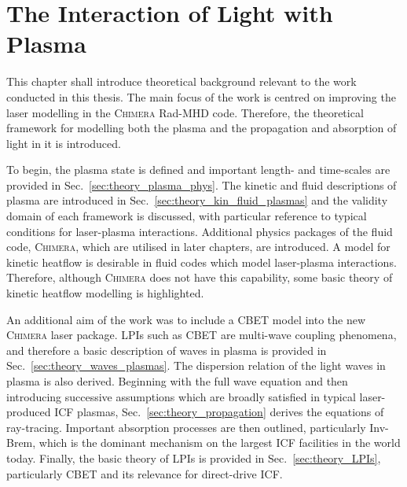 \chapter{The Interaction of Light with Plasma}%
\label{chap:Theory}

This chapter shall introduce theoretical background relevant to the work conducted in this thesis.
The main focus of the work is centred on improving the laser modelling in the \textsc{Chimera} \ac{Rad-MHD} code.
Therefore, the theoretical framework for modelling both the plasma and the propagation and absorption of light in it is introduced.

To begin, the plasma state is defined and important length- and time-scales are provided in Sec.~\ref{sec:theory_plasma_phys}.
The kinetic and fluid descriptions of plasma are introduced in Sec.~\ref{sec:theory_kin_fluid_plasmas} and the validity domain of each framework is discussed, with particular reference to typical conditions for laser-plasma interactions.
Additional physics packages of the fluid code, \textsc{Chimera}, which are utilised in later chapters, are introduced.
A model for kinetic heatflow is desirable in fluid codes which model laser-plasma interactions.
Therefore, although \textsc{Chimera} does not have this capability, some basic theory of kinetic heatflow modelling is highlighted.

An additional aim of the work was to include a \ac{CBET} model into the new \textsc{Chimera} laser package.
\ac{LPIs} such as \ac{CBET} are multi-wave coupling phenomena, and therefore a basic description of waves in plasma is provided in Sec.~\ref{sec:theory_waves_plasmas}.
The dispersion relation of the light waves in plasma is also derived.
Beginning with the full wave equation and then introducing successive assumptions which are broadly satisfied in typical laser-produced \ac{ICF} plasmas, Sec.~\ref{sec:theory_propagation} derives the equations of ray-tracing.
Important absorption processes are then outlined, particularly \ac{Inv-Brem}, which is the dominant mechanism on the largest \ac{ICF} facilities in the world today.
Finally, the basic theory of \ac{LPIs} is provided in Sec.~\ref{sec:theory_LPIs}, particularly \ac{CBET} and its relevance for direct-drive \ac{ICF}.

\newpage

